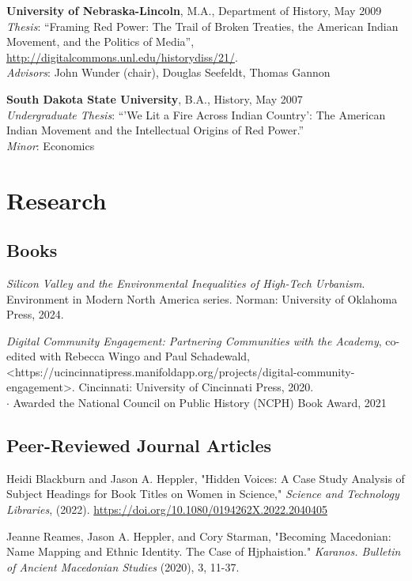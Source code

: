 \documentclass[10pt]{article}
\begin{document}
\textbf{University of Nebraska-Lincoln}, M.A., Department of History, May 2009 \\
\textit{Thesis}: ``Framing Red Power: The Trail of Broken Treaties, the American Indian Movement, and the Politics of Media'', \url{http://digitalcommons.unl.edu/historydiss/21/}. \\
\textit{Advisors}: John Wunder (chair), Douglas Seefeldt, Thomas Gannon

\textbf{South Dakota State University}, B.A., History, May 2007 \\
\textit{Undergraduate Thesis}: ``'We Lit a Fire Across Indian Country': The American Indian Movement and the Intellectual Origins of Red Power.'' \\
\textit{Minor}: Economics


\section*{Research}


\subsection*{Books}

\textit{Silicon Valley and the Environmental Inequalities of High-Tech Urbanism}. Environment in Modern North America series. Norman: University of Oklahoma Press, 2024.

\textit{Digital Community Engagement: Partnering Communities with the Academy}, co-edited with Rebecca Wingo and Paul Schadewald, <https://ucincinnatipress.manifoldapp.org/projects/digital-community-engagement>. Cincinnati: University of Cincinnati Press, 2020. \\
\quad $\cdot$ Awarded the National Council on Public History (NCPH) Book Award, 2021

\subsection*{Peer-Reviewed Journal Articles}\label{peer-reviewed}

Heidi Blackburn and Jason A. Heppler, "Hidden Voices: A Case Study Analysis of Subject Headings for Book Titles on Women in Science," \textit{Science and Technology Libraries}, (2022). \url{https://doi.org/10.1080/0194262X.2022.2040405}

Jeanne Reames, Jason A. Heppler, and Cory Starman, "Becoming Macedonian: Name Mapping and Ethnic Identity. The Case of Hjphaistion." \textit{Karanos. Bulletin of Ancient Macedonian Studies} (2020), 3, 11-37.
\end{document}
